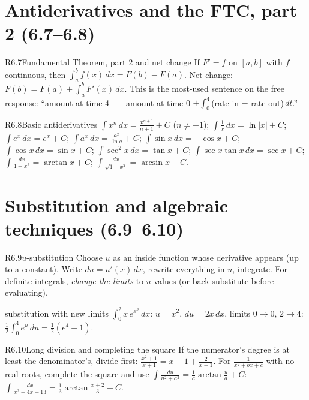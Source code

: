 \documentclass{apcalc}
\begin{document}
\section{Antiderivatives and the FTC, part 2 (6.7--6.8)}

\begin{rulebox}{R6.7}{Fundamental Theorem, part 2 and net change}
If $F'=f$ on $[a,b]$ with $f$ continuous, then $\displaystyle\int_a^b f(x)\,dx=F(b)-F(a)$. Net change: $F(b)=F(a)+\int_a^b F'(x)\,dx$. This is the most-used sentence on the free response: ``amount at time 4 $=$ amount at time 0 $+\int_0^4$(rate in $-$ rate out)$\,dt$.''
\end{rulebox}

\begin{rulebox}{R6.8}{Basic antiderivatives}
$\int x^n\,dx=\frac{x^{n+1}}{n+1}+C$ ($n\neq-1$); $\int\frac1x\,dx=\ln|x|+C$; $\int e^x\,dx=e^x+C$; $\int a^x\,dx=\frac{a^x}{\ln a}+C$; $\int\sin x\,dx=-\cos x+C$; $\int\cos x\,dx=\sin x+C$; $\int\sec^2x\,dx=\tan x+C$; $\int\sec x\tan x\,dx=\sec x+C$; $\int\frac{dx}{1+x^2}=\arctan x+C$; $\int\frac{dx}{\sqrt{1-x^2}}=\arcsin x+C$.
\end{rulebox}

\section{Substitution and algebraic techniques (6.9--6.10)}

\begin{rulebox}{R6.9}{$u$-substitution}
Choose $u$ as an inside function whose derivative appears (up to a constant). Write $du=u'(x)\,dx$, rewrite everything in $u$, integrate. For definite integrals, \emph{change the limits} to $u$-values (or back-substitute before evaluating).
\end{rulebox}

\begin{example}{substitution with new limits}
$\displaystyle\int_0^{2}x\,e^{x^2}\,dx$: $u=x^2$, $du=2x\,dx$, limits $0\to0$, $2\to4$: $\frac12\int_0^4e^u\,du=\frac12(e^4-1)$. 
\end{example}

\begin{rulebox}{R6.10}{Long division and completing the square}
If the numerator's degree is at least the denominator's, divide first: $\frac{x^2+1}{x+1}=x-1+\frac{2}{x+1}$. For $\frac{1}{x^2+bx+c}$ with no real roots, complete the square and use $\int\frac{du}{u^2+a^2}=\frac1a\arctan\frac ua+C$: $\int\frac{dx}{x^2+4x+13}=\frac13\arctan\frac{x+2}{3}+C$.
\end{rulebox}
\end{document}
